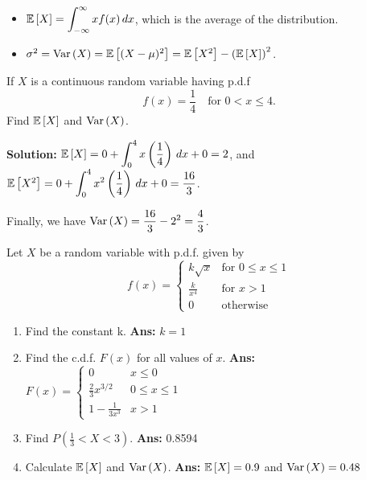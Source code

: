 \begin{remark}
    \phantom{}\
    \begin{itemize}
        \item $\mathbb{E}\left[{X}\right] = \displaystyle \int_{-\infty}^{\infty} xf(x) \, dx$, which is the average of the distribution.
        \item $\sigma^2 = \operatorname{Var}\left({X}\right) = \mathbb{E}\left[{(X - \mu)^2}\right] = \mathbb{E}\left[{X^2}\right] - \left( \mathbb{E}\left[{X}\right] \right)^2$.
    \end{itemize}
\end{remark}

\begin{example}
    If $X$ is a continuous random variable having p.d.f 
    \[f(x) = \frac{1}{4} \quad \text{for $0 < x \leq 4$}.\]
    Find $\mathbb{E}\left[{X}\right]$ and $\operatorname{Var}\left({X}\right)$.

    \textbf{Solution:} $\mathbb{E}\left[{X}\right] = 0 + \displaystyle \int_{0}^{4} x \left( \frac{1}{4} \right) \, dx + 0= 2$,
    and $\mathbb{E}\left[{X^2}\right] = 0 + \displaystyle \int_{0}^{4} x^2 \left( \frac{1}{4} \right) \, dx + 0 = \frac{16}{3}$.

    Finally, we have $\displaystyle \operatorname{Var}\left({X}\right) = \frac{16}{3} - 2^2 = \frac{4}{3}$. \\
\end{example}

\begin{example}
    Let $X$ be a random variable with p.d.f. given by
    \[
        f(x) = 
        \begin{cases} 
        k \sqrt{x} & \text{for } 0 \leq x \leq 1 \\
        \frac{k}{x^4} & \text{for } x > 1 \\
        0 & \text{otherwise}
        \end{cases}
    \]
    \begin{enumerate}[label=(\alph*)]
        \item Find the constant k. \quad \textbf{Ans:} $k = 1$
        \item Find the c.d.f. $F(x)$ for all values of $x$. \quad
        \textbf{Ans:} 
        $F(x) = 
        \begin{cases} 
            0 & x \leq 0 \\
            \frac{2}{3} x^{3/2} & 0 \leq x \leq 1 \\
            1 - \frac{1}{3x^3} & x > 1
        \end{cases}$
        \item Find $P(\frac{1}{3} < X < 3)$. \quad \textbf{Ans:} 0.8594
        \item Calculate $\mathbb{E}\left[{X}\right]$ and $\operatorname{Var}\left({X}\right)$. \quad \textbf{Ans:} $\mathbb{E}\left[{X}\right] = 0.9$ and $\operatorname{Var}\left({X}\right) = 0.48$
    \end{enumerate}
\end{example}


